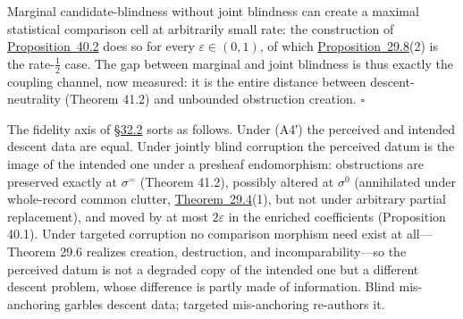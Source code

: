 \begin{thmplain}

Marginal candidate-blindness without joint blindness can create a maximal statistical comparison cell at arbitrarily small rate: the construction of \hyperlink{stmt:40.2}{Proposition~40.2} does so for every \(\varepsilon \in (0, 1)\), of which \hyperlink{stmt:29.8}{Proposition~29.8}(2) is the rate-\(\tfrac12\) case. The gap between marginal and joint blindness is thus exactly the coupling channel, now measured: it is the entire distance between descent-neutrality (Theorem 41.2) and unbounded obstruction creation. \(\square\)
\end{thmplain}

\begin{thmrem}

The fidelity axis of \hyperlink{sec:32.2}{§32.2} sorts as follows. Under (A4′) the perceived and intended descent data are equal. Under jointly blind corruption the perceived datum is the image of the intended one under a presheaf endomorphism: obstructions are preserved exactly at \(\sigma^{=}\) (Theorem 41.2), possibly altered at \(\sigma^{0}\) (annihilated under whole-record common clutter, \hyperlink{stmt:29.4}{Theorem~29.4}(1), but not under arbitrary partial replacement), and moved by at most \(2\varepsilon\) in the enriched coefficients (Proposition 40.1). Under targeted corruption no comparison morphism need exist at all---\hspace{0pt}Theorem 29.6 realizes creation, destruction, and incomparability---\hspace{0pt}so the perceived datum is not a degraded copy of the intended one but a different descent problem, whose difference is partly made of information. Blind mis-anchoring garbles descent data; targeted mis-anchoring re-authors it.
\end{thmrem}



